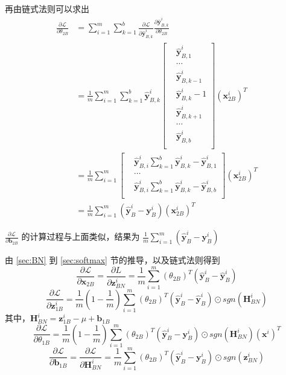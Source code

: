 \documentclass[lang=cn,11pt,a4paper,cite=authoryear]{elegantpaper}
\newcommand{\diff}[2]{\frac{\partial #1}{\partial #2}}
\newcommand{\hbf}[1]{\hat{\mathbf{#1}}}
\begin{document}
再由链式法则可以求出
\begin{equation}
  \begin{aligned}
    \diff{\mathcal{L}}{\theta_{2B}}&=\sum_{i=1}^m\sum_{k=1}^b \diff{\mathcal{L}}{\hbf{y}_{B,k}^i} \diff{\hbf{y}_{B,k}^i}{\theta_{2B}}\\
    &=\frac{1}{m}\sum_{i=1}^m\sum_{k=1}^b\hbf{y}_{B,k}^i\left [
    \begin{aligned}
      &\hbf{y}_{B,1}^i \\
      &\cdots \\
      &\hbf{y}_{B,k-1}^i\\
      &\hbf{y}_{B,k}^i-1\\
      &\hbf{y}_{B,k+1}^i\\
      &\cdots \\
      &\hbf{y}_{B,b}^i\\
    \end{aligned}  
    \right] (\mathbf{x}_{2B}^i)^T \\
    &=\frac{1}{m}\sum_{i=1}^m\left [
      \begin{aligned}
        &\hbf{y}_{B,i}^i\sum_{k=1}^b \hbf{y}_{B,k}^i-\hbf{y}_{B,1}^i \\
        &\cdots \\
        &\hbf{y}_{B,i}^i\sum_{k=1}^b \hbf{y}_{B,k}^i-\hbf{y}_{B,b}^i\\
      \end{aligned}  
    \right](\mathbf{x}_{2B}^i)^T \\
    &=\frac{1}{m}\sum_{i=1}^m(\hbf{y}_B^i-\mathbf{y}_B^i) (\mathbf{x}_{2B}^i)^T
  \end{aligned}
\end{equation}

$\diff{\mathcal{L}}{\mathbf{b}_{2B}}$ 的计算过程与上面类似，结果为 $\frac{1}{m}\sum_{i=1}^m(\hbf{y}_B^i-\mathbf{y}_B^i)$

由 \ref{sec:BN} 到 \ref{sec:softmax} 节的推导，以及链式法则得到
\begin{equation}
  \diff{\mathcal{L}}{\mathbf{x}_{2B}}=\diff{L}{\mathbf{z}_{BN}^i}=\frac{1}{m}\sum_{i=1}^m (\theta_{2B})^T (\hbf{y}_B^i-\hbf{y}_B^i)
\end{equation}
\begin{equation}
  \diff{\mathcal{L}}{\mathbf{z}_{1B}^i}=\frac{1}{m}(1-\frac{1}{m})\sum_{i=1}^m (\theta_{2B})^T(\hbf{y}^i_B -\hbf{y}_B^i)\odot sgn(\mathbf{H}_{BN}^i)
\end{equation}
其中，$\mathbf{H}_{BN}^i=\mathbf{z}_{1B}^i-\mu+\mathbf{b}_{1B}$
\begin{equation}
  \diff{\mathcal{L}}{\theta_{1B}}=\frac{1}{m}(1-\frac{1}{m})\sum_{i=1}^m(\theta_{2B})^T(\hbf{y}_B^i-\mathbf{y}_B^i)\odot sgn(\mathbf{H}_{BN}^i)(\mathbf{x}^i)^T
\end{equation}
\begin{equation}
  \diff{\mathcal{L}}{\mathbf{b}_{1B}}=\diff{\mathcal{L}}{\mathbf{H}_{BN}^i}=\frac{1}{m}\sum_{i=1}^m (\theta_{2B})^T (\hbf{y}_B^i-\mathbf{y}_B^i)\odot sgn(\mathbf{z}_{BN}^i)
\end{equation}
\end{document}
